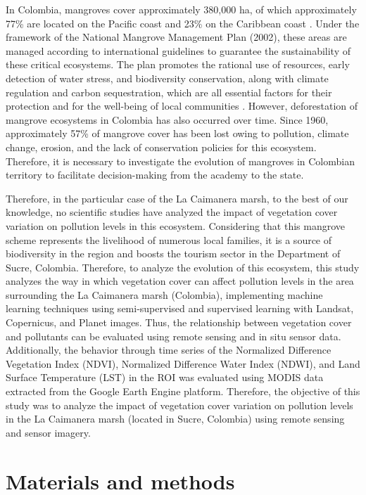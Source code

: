 \documentclass[10pt,a4paper,twocolumn]{article}
\begin{document}
In Colombia, mangroves cover approximately 380,000 ha, of which approximately 77\% are located on the Pacific coast and 23\% on the Caribbean coast \cite{quintero2022variabilidad}. Under the framework of the National Mangrove Management Plan (2002), these areas are managed according to international guidelines to guarantee the sustainability of these critical ecosystems. The plan promotes the rational use of resources, early detection of water stress, and biodiversity conservation, along with climate regulation and carbon sequestration, which are all essential factors for their protection and for the well-being of local communities \cite{carsucre2023pai}. However, deforestation of mangrove ecosystems in Colombia has also occurred over time. Since 1960, approximately 57\% of mangrove cover has been lost owing to pollution, climate change, erosion, and the lack of conservation policies for this ecosystem. Therefore, it is necessary to investigate the evolution of mangroves in Colombian territory to facilitate decision-making from the academy to the state. 

Therefore, in the particular case of the La Caimanera marsh, to the best of our knowledge, no scientific studies have analyzed the impact of vegetation cover variation on pollution levels in this ecosystem. Considering that this mangrove scheme represents the livelihood of numerous local families, it is a source of biodiversity in the region and boosts the tourism sector in the Department of Sucre, Colombia. Therefore, to analyze the evolution of this ecosystem, this study analyzes the way in which vegetation cover can affect pollution levels in the area surrounding the La Caimanera marsh (Colombia), implementing machine learning techniques using semi-supervised and supervised learning with Landsat, Copernicus, and Planet images. Thus, the relationship between vegetation cover and pollutants can be evaluated using remote sensing and in situ sensor data. Additionally, the behavior through time series of the Normalized Difference Vegetation Index (NDVI), Normalized Difference Water Index (NDWI), and Land Surface Temperature (LST) in the ROI was evaluated using MODIS data extracted from the Google Earth Engine platform. Therefore, the objective of this study was to analyze the impact of vegetation cover variation on pollution levels in the La Caimanera marsh (located in Sucre, Colombia) using remote sensing and sensor imagery. 

\section*{Materials and methods}
\end{document}
